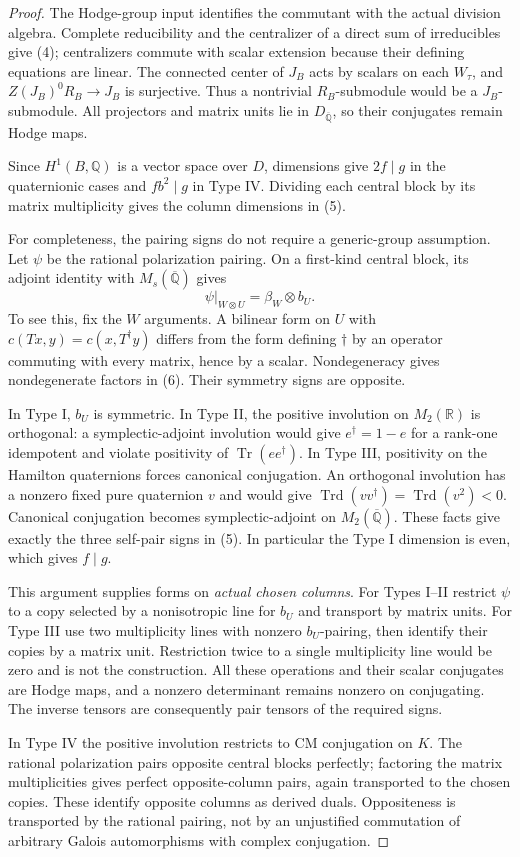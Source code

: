 \documentclass[11pt]{article}
\newcommand{\Q}{\mathbb Q}
\newcommand{\R}{\mathbb R}
\newcommand{\kk}{{\overline{\mathbb Q}}}
\DeclareMathOperator{\Tr}{Tr}
\DeclareMathOperator{\Trd}{Trd}
\theoremstyle{remark}
\begin{document}
\begin{proof}
The Hodge-group input identifies the commutant with the actual division
algebra. Complete reducibility and the centralizer of a direct sum of
irreducibles give (4); centralizers commute with scalar extension
because their defining equations are linear. The connected center of
$J_B$ acts by scalars on each $W_\tau$, and $Z(J_B)^0R_B\to J_B$ is
surjective. Thus a nontrivial $R_B$-submodule would be a
$J_B$-submodule. All projectors and matrix units lie in $D_\kk$, so
their conjugates remain Hodge maps.

Since $H^1(B,\Q)$ is a vector space over $D$, dimensions give
$2f\mid g$ in the quaternionic cases and $fb^2\mid g$ in Type IV.
Dividing each central block by its matrix multiplicity gives the
column dimensions in (5).

For completeness, the pairing signs do not require a generic-group
assumption. Let $\psi$ be the rational polarization pairing. On a
first-kind central block, its adjoint identity with $M_s(\kk)$ gives
\[
 \psi|_{W\otimes U}=\beta_W\otimes b_U.
 \tag{6}
\]
To see this, fix the $W$ arguments. A bilinear form on $U$ with
$c(Tx,y)=c(x,T^\dagger y)$ differs from the form defining
$\dagger$ by an operator commuting with every matrix, hence by a
scalar. Nondegeneracy gives nondegenerate factors in (6).
Their symmetry signs are opposite.

In Type I, $b_U$ is symmetric. In Type II, the positive involution on
$M_2(\R)$ is orthogonal: a symplectic-adjoint involution would give
$e^\dagger=1-e$ for a rank-one idempotent and violate positivity of
$\Tr(ee^\dagger)$. In Type III, positivity on the Hamilton quaternions
forces canonical conjugation. An orthogonal involution has a nonzero
fixed pure quaternion $v$ and would give
$\Trd(vv^\dagger)=\Trd(v^2)<0$. Canonical conjugation becomes
symplectic-adjoint on $M_2(\kk)$. These facts give exactly the three
self-pair signs in (5). In particular the Type I dimension is even,
which gives $f\mid g$.

This argument supplies forms on \emph{actual chosen columns}. For
Types I--II restrict $\psi$ to a copy selected by a nonisotropic line
for $b_U$ and transport by matrix units. For Type III use two
multiplicity lines with nonzero $b_U$-pairing, then identify their
copies by a matrix unit. Restriction twice to a single multiplicity
line would be zero and is not the construction. All these operations
and their scalar conjugates are Hodge maps, and a nonzero determinant
remains nonzero on conjugating. The inverse tensors are consequently
pair tensors of the required signs.

In Type IV the positive involution restricts to CM conjugation on $K$.
The rational polarization pairs opposite central blocks perfectly;
factoring the matrix multiplicities gives perfect opposite-column
pairs, again transported to the chosen copies. These identify opposite
columns as derived duals. Oppositeness is transported by the rational
pairing, not by an unjustified commutation of arbitrary Galois
automorphisms with complex conjugation.
\end{proof}
\end{document}
